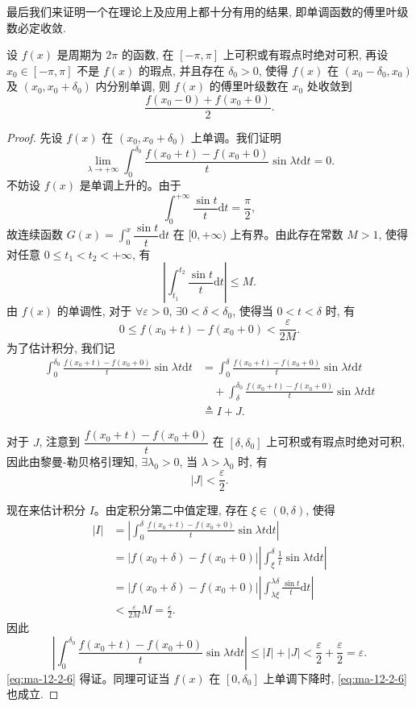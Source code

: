 最后我们来证明一个在理论上及应用上都十分有用的结果, 即单调函数的傅里叶级数必定收敛.

\begin{theorem}[{狄利克雷定理}]\label{theorem:ma-12-2-6}
设 $f(x)$ 是周期为 $2\pi$ 的函数, 在 $[-\pi,\pi]$ 上可积或有瑕点时绝对可积, 再设 $x_0\in[-\pi,\pi]$ 不是 $f(x)$ 的瑕点, 并且存在 $\delta_0>0$, 使得 $f(x)$ 在 $(x_0-\delta_0,x_0)$ 及 $(x_0,x_0+\delta_0)$ 内分别单调, 则 $f(x)$ 的傅里叶级数在 $x_0$ 处收敛到
\[
  \frac{f(x_0-0)+f(x_0+0)}{2}.
\]
\end{theorem}


\begin{proof}
先设 $f(x)$ 在 $(x_0,x_0+\delta_0)$ 上单调。我们证明
\begin{equation}
  \lim_{\lambda\to+\infty}\int_0^{\delta_0}
  \frac{f(x_0+t)-f(x_0+0)}{t}\sin\lambda t\mathrm dt=0.
  \label{eq:ma-12-2-6}
\end{equation}
不妨设 $f(x)$ 是单调上升的。由于
\[
  \int_0^{+\infty}\frac{\sin t}{t}\mathrm dt=\frac{\pi}{2},
\]
故连续函数 $G(x)=\displaystyle\int_0^x\dfrac{\sin t}{t}\mathrm dt$ 在 $[0,+\infty)$ 上有界。由此存在常数 $M>1$, 使得对任意 $0\leqslant t_1<t_2<+\infty$, 有
\[
  \left|\int_{t_1}^{t_2}\frac{\sin t}{t}\mathrm dt\right|\leqslant M.
\]
由 $f(x)$ 的单调性, 对于 $\forall\varepsilon>0$, $\exists 0<\delta<\delta_0$, 使得当 $0<t<\delta$ 时, 有
\[
  0\leqslant f(x_0+t)-f(x_0+0)<\frac{\varepsilon}{2M}.
\]
为了估计积分, 我们记
\[
\begin{aligned}
  \int_0^{\delta_0}\frac{f(x_0+t)-f(x_0+0)}{t}\sin\lambda t\mathrm dt
  &=
  \int_0^\delta\frac{f(x_0+t)-f(x_0+0)}{t}\sin\lambda t\mathrm dt\\
  &\quad+
  \int_\delta^{\delta_0}\frac{f(x_0+t)-f(x_0+0)}{t}\sin\lambda t\mathrm dt\\
  &\triangleq I+J.
\end{aligned}
\]

对于 $J$, 注意到 $\dfrac{f(x_0+t)-f(x_0+0)}{t}$ 在 $[\delta,\delta_0]$ 上可积或有瑕点时绝对可积, 因此由黎曼-勒贝格引理知, $\exists\lambda_0>0$, 当 $\lambda>\lambda_0$ 时, 有
\[
  |J|<\frac{\varepsilon}{2}.
\]

现在来估计积分 $I$。由定积分第二中值定理, 存在 $\xi\in(0,\delta)$, 使得
\[
\begin{aligned}
  |I|
  &=
  \left|\int_0^\delta\frac{f(x_0+t)-f(x_0+0)}{t}\sin\lambda t\mathrm dt\right|\\
  &=
  |f(x_0+\delta)-f(x_0+0)|
  \left|\int_\xi^\delta\frac1t\sin\lambda t\mathrm dt\right|\\
  &=
  |f(x_0+\delta)-f(x_0+0)|
  \left|\int_{\lambda\xi}^{\lambda\delta}\frac{\sin t}{t}\mathrm dt\right|\\
  &<
  \frac{\varepsilon}{2M}M=\frac{\varepsilon}{2}.
\end{aligned}
\]
因此
\[
  \left|\int_0^{\delta_0}\frac{f(x_0+t)-f(x_0+0)}{t}\sin\lambda t\mathrm dt\right|
  \leqslant |I|+|J|<\frac{\varepsilon}{2}+\frac{\varepsilon}{2}=\varepsilon.
\]
\eqref{eq:ma-12-2-6} 得证。同理可证当 $f(x)$ 在 $[0,\delta_0]$ 上单调下降时, \eqref{eq:ma-12-2-6} 也成立.


\end{proof}
